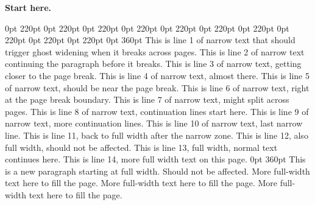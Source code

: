 \documentclass[a4paper,11pt]{article}
\begin{document}
\vspace*{5cm}
\noindent\textbf{Start here.}\par
 0pt 220pt 0pt 220pt 0pt 220pt 0pt 220pt 0pt 220pt 0pt 220pt 0pt 220pt 0pt 220pt 0pt 220pt 0pt 220pt 0pt 360pt
This is line 1 of narrow text that should trigger ghost widening when it breaks across pages.
This is line 2 of narrow text continuing the paragraph before it breaks.
This is line 3 of narrow text, getting closer to the page break.
This is line 4 of narrow text, almost there.
This is line 5 of narrow text, should be near the page break.
This is line 6 of narrow text, right at the page break boundary.
This is line 7 of narrow text, might split across pages.
This is line 8 of narrow text, continuation lines start here.
This is line 9 of narrow text, more continuation lines.
This is line 10 of narrow text, last narrow line.
This is line 11, back to full width after the narrow zone.
This is line 12, also full width, should not be affected.
This is line 13, full width, normal text continues here.
This is line 14, more full width text on this page.
 0pt 360pt
This is a new paragraph starting at full width. Should not be affected.
More full-width text here to fill the page.
More full-width text here to fill the page.
More full-width text here to fill the page.
\end{document}
